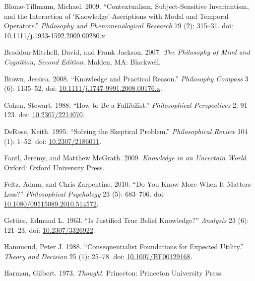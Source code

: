 \documentclass[
  11pt,
  letterpaper,
  DIV=11,
  numbers=noendperiod,
  twoside]{scrartcl}
\newlength{\cslhangindent}
\newenvironment{CSLReferences}[2] %
 {\begin{list}{}{%
  \setlength{\itemindent}{0pt}
  \setlength{\leftmargin}{0pt}
  \setlength{\parsep}{0pt}
  \ifodd #1
   \setlength{\leftmargin}{\cslhangindent}
   \setlength{\itemindent}{-1\cslhangindent}
  \fi
  \setlength{\itemsep}{#2\baselineskip}}}
 {\end{list}}
\begin{document}
\label{refs}
\begin{CSLReferences}{1}{0}
Blome-Tillmann, Michael. 2009. {``Contextualism, Subject-Sensitive
Invariantism, and the Interaction of {`Knowledge'}-Ascriptions with
Modal and Temporal Operators.''} \emph{Philosophy and Phenomenological
Research} 79 (2): 315--31. doi:
\href{https://doi.org/10.1111/j.1933-1592.2009.00280.x}{10.1111/j.1933-1592.2009.00280.x}.

Braddon-Mitchell, David, and Frank Jackson. 2007. \emph{The Philosophy
of Mind and Cognition, {Second Edition}}. Malden, MA: Blackwell.

Brown, Jessica. 2008. {``Knowledge and Practical Reason.''}
\emph{Philosophy Compass} 3 (6): 1135--52. doi:
\href{https://doi.org/10.1111/j.1747-9991.2008.00176.x}{10.1111/j.1747-9991.2008.00176.x}.

Cohen, Stewart. 1988. {``How to Be a Fallibilist.''} \emph{Philosophical
Perspectives} 2: 91--123. doi:
\href{https://doi.org/10.2307/2214070}{10.2307/2214070}.

DeRose, Keith. 1995. {``Solving the Skeptical Problem.''}
\emph{Philosophical Review} 104 (1): 1--52. doi:
\href{https://doi.org/10.2307/2186011}{10.2307/2186011}.

Fantl, Jeremy, and Matthew McGrath. 2009. \emph{Knowledge in an
Uncertain World}. Oxford: Oxford University Press.

Feltz, Adam, and Chris Zarpentine. 2010. {``Do You Know More When It
Matters Less?''} \emph{Philosophical Psychology} 23 (5): 683--706. doi:
\href{https://doi.org/10.1080/09515089.2010.514572}{10.1080/09515089.2010.514572}.

Gettier, Edmund L. 1963. {``Is Justified True Belief Knowledge?''}
\emph{Analysis} 23 (6): 121--23. doi:
\href{https://doi.org/10.2307/3326922}{10.2307/3326922}.

Hammond, Peter J. 1988. {``Consequentialist Foundations for Expected
Utility.''} \emph{Theory and Decision} 25 (1): 25--78. doi:
\href{https://doi.org/10.1007/BF00129168}{10.1007/BF00129168}.

Harman, Gilbert. 1973. \emph{Thought}. Princeton: Princeton University
Press.


\end{CSLReferences}
\end{document}
